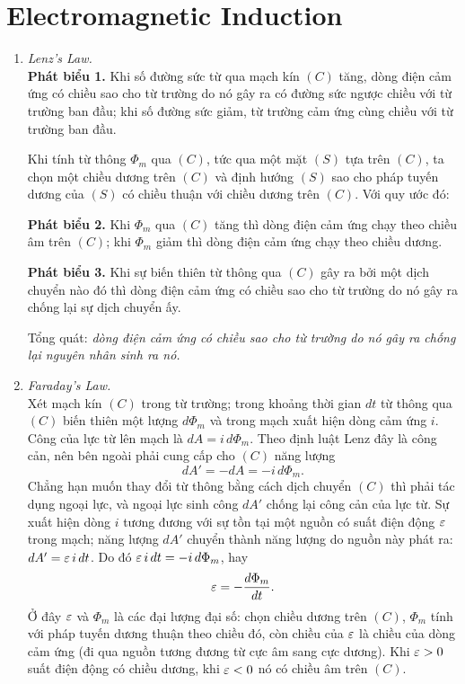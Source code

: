 \section{Electromagnetic Induction}
\begin{enumerate}
\item \textit{Lenz's Law.}\\
\textbf{Phát biểu 1.} Khi số đường sức từ qua mạch kín $(C)$ tăng, dòng điện cảm ứng có chiều sao cho từ trường do nó gây ra có đường sức ngược chiều với từ trường ban đầu; khi số đường sức giảm, từ trường cảm ứng cùng chiều với từ trường ban đầu.

Khi tính từ thông $\Phi_m$ qua $(C)$, tức qua một mặt $(S)$ tựa trên $(C)$, ta chọn một chiều dương trên $(C)$ và định hướng $(S)$ sao cho pháp tuyến dương của $(S)$ có chiều thuận với chiều dương trên $(C)$. Với quy ước đó:

\textbf{Phát biểu 2.} Khi $\Phi_m$ qua $(C)$ tăng thì dòng điện cảm ứng chạy theo chiều âm trên $(C)$; khi $\Phi_m$ giảm thì dòng điện cảm ứng chạy theo chiều dương.

\textbf{Phát biểu 3.} Khi sự biến thiên từ thông qua $(C)$ gây ra bởi một dịch chuyển nào đó thì dòng điện cảm ứng có chiều sao cho từ trường do nó gây ra chống lại sự dịch chuyển ấy.

Tổng quát: \textit{dòng điện cảm ứng có chiều sao cho từ trường do nó gây ra chống lại nguyên nhân sinh ra nó.}

\item \textit{Faraday's Law.}\\
Xét mạch kín $(C)$ trong từ trường; trong khoảng thời gian $dt$ từ thông qua $(C)$ biến thiên một lượng $d\Phi_m$ và trong mạch xuất hiện dòng cảm ứng $i$. Công của lực từ lên mạch là $dA = i\,d\Phi_m$. Theo định luật Lenz đây là công cản, nên bên ngoài phải cung cấp cho $(C)$ năng lượng
\[
dA' = -dA = -i\,d\Phi_m.
\]
Chẳng hạn muốn thay đổi từ thông bằng cách dịch chuyển $(C)$ thì phải tác dụng ngoại lực, và ngoại lực sinh công $dA'$ chống lại công cản của lực từ. Sự xuất hiện dòng $i$ tương đương với sự tồn tại một nguồn có suất điện động $\varepsilon$ trong mạch; năng lượng $dA'$ chuyển thành năng lượng do nguồn này phát ra: $dA' = \varepsilon\,i\,dt$. Do đó $\varepsilon\,i\,dt = -i\,d\Phi_m$, hay
\begin{equation}\label{eq:faraday}
\varepsilon = -\frac{d\Phi_m}{dt}.
\end{equation}
Ở đây $\varepsilon$ và $\Phi_m$ là các đại lượng đại số: chọn chiều dương trên $(C)$, $\Phi_m$ tính với pháp tuyến dương thuận theo chiều đó, còn chiều của $\varepsilon$ là chiều của dòng cảm ứng (đi qua nguồn tương đương từ cực âm sang cực dương). Khi $\varepsilon > 0$ suất điện động có chiều dương, khi $\varepsilon < 0$ nó có chiều âm trên $(C)$.


\end{enumerate}
